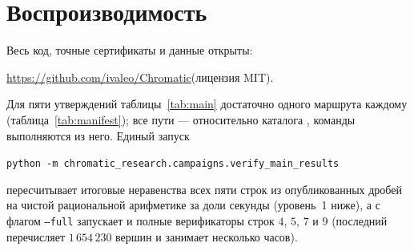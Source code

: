 \section{Воспроизводимость}\label{sec:repro}

Весь код, точные сертификаты и данные открыты:
\begin{center}
\url{https://github.com/ivaleo/Chromatic}\quad (лицензия MIT).
\end{center}
Для пяти утверждений таблицы~\ref{tab:main} достаточно одного маршрута
каждому (таблица~\ref{tab:manifest}); все пути --- относительно каталога
, команды выполняются из него.
Единый запуск
\begin{center}
\texttt{python -m chromatic\_research.campaigns.verify\_main\_results}
\end{center}
пересчитывает итоговые неравенства всех пяти строк из опубликованных
дробей на чистой рациональной арифметике за доли секунды (уровень~1 ниже),
а с флагом \texttt{--full} запускает и полные верификаторы строк $4$, $5$,
$7$ и $9$ (последний перечисляет $1\,654\,230$ вершин и занимает несколько
часов).

